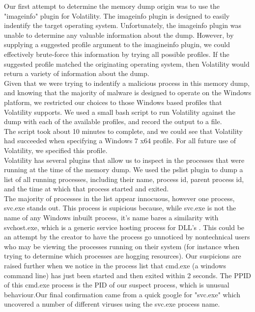 Our first attempt to determine the memory dump origin was to use the "imageinfo" plugin for Volatility. The imageinfo plugin is designed to easily indentify the target operating system. Unfortunately, the imageinfo plugin was unable to determine any valuable information about the dump. However, by supplying a suggested profile argument to the imagineinfo plugin, we could effectively brute-force this information by trying all possible profiles. If the suggested profile matched the originating operating system, then Volatility would return a variety of information about the dump. \\

Given that we were trying to indentify a malicious process in this memory dump, and knowing that the majority of malware is designed to operate on the Windows platform, we restricted our choices to those Windows based profiles that Volatility supports. We used a small bash script to run Volatility against the dump with each of the available profiles, and record the output to a file.\\ 
The script took about 10 minutes to complete, and we could see that Volatility had succeeded when specifying a Windows 7 x64 profile. For all future use of Volatility, we specified this profile.\\

Volatility has several plugins that allow us to inspect in the processes that were running at the time of the memory dump. We used the pslist plugin to dump a list of all running processes, including their name, process id, parent process id, and the time at which that process started and exited. \\

The majority of processes in the list appear innocuous, however one process, svc.exe stands out. This process is supicious because, while svc.exe is not the name of any Windows inbuilt process, it's name bares a similarity with svchost.exe, which is a generic service hosting process for DLL's \cite[11]{winint}. This could be an attempt by the creator to have the process go unnoticed by nontechnical users who may be viewing the processes running on their system (for instance when trying to determine which processes are hogging resources). Our suspicions are raised further when we notice in the process list that cmd.exe (a windows command line) has just been started and then exited within 2 seconds. The PPID of this cmd.exe process is the PID of our suspect process, which is unusual behaviour.Our final confirmation came from a quick google for "svc.exe" which uncovered a number of different viruses using the svc.exe process name.\\

